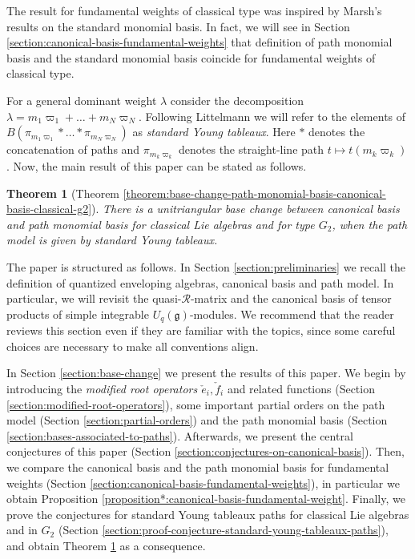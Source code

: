 \documentclass[final]{amsart}
\theoremstyle{plain}
\newtheorem{theorem*}[conjecture*]{Theorem}
\theoremstyle{definition}
\newcommand{\calR}{\mathcal R}
\newcommand{\frakg}{\mathfrak g}
\newcommand{\cf}{\check{f}}
\newcommand{\ce}{\check{e}}
\begin{document}
The result for fundamental weights of classical type was inspired by Marsh's results \cite{Marsh:CanonicalBasis-StandardMonomials} on the standard monomial basis.
In fact, we will see in Section \ref{section:canonical-basis-fundamental-weights} that definition of path monomial basis and the standard monomial basis coincide for fundamental weights of classical type.

For a general dominant weight $\lambda$ consider the decomposition $\lambda = m_1\varpi_1 + \dots + m_N\varpi_N$.
Following Littelmann \cite{Littelmann:PlacticAlgebra-SemisimpleLieAlgebras} we will refer to the elements of $B(\pi_{m_1\varpi_1} * \dots * \pi_{m_N\varpi_N})$ as \emph{standard Young tableaux}.
Here $*$ denotes the concatenation of paths and $\pi_{m_k\varpi_k}$ denotes the straight-line path $t \mapsto t(m_k\varpi_k)$.
Now, the main result of this paper can be stated as follows.

\begin{theorem*}[Theorem \ref{theorem:base-change-path-monomial-basis-canonical-basis-classical-g2}]
    \label{theorem*:base-change}
    There is a unitriangular base change between canonical basis and path monomial basis for classical Lie algebras and for type $G_2$, when the path model is given by standard Young tableaux.
\end{theorem*}

The paper is structured as follows.
In Section \ref{section:preliminaries} we recall the definition of quantized enveloping algebras, canonical basis and path model.
In particular, we will revisit the quasi-$\calR$-matrix and the canonical basis of tensor products of simple integrable $U_q(\frakg)$-modules.
We recommend that the reader reviews this section even if they are familiar with the topics, since some careful choices are necessary to make all conventions align.

In Section \ref{section:base-change} we present the results of this paper.
We begin by introducing the \emph{modified root operators $\ce_i, \cf_i$} and related functions (Section \ref{section:modified-root-operators}), some important partial orders on the path model (Section \ref{section:partial-orders}) and the path monomial basis (Section \ref{section:bases-associated-to-paths}).
Afterwards, we present the central conjectures of this paper (Section \ref{section:conjectures-on-canonical-basis}).
Then, we compare the canonical basis and the path monomial basis for fundamental weights (Section \ref{section:canonical-basis-fundamental-weights}), in particular we obtain Proposition \ref{proposition*:canonical-basis-fundamental-weight}.
Finally, we prove the conjectures for standard Young tableaux paths for classical Lie algebras and in $G_2$ (Section \ref{section:proof-conjecture-standard-young-tableaux-paths}), and obtain Theorem \ref{theorem*:base-change} as a consequence.
\end{document}
